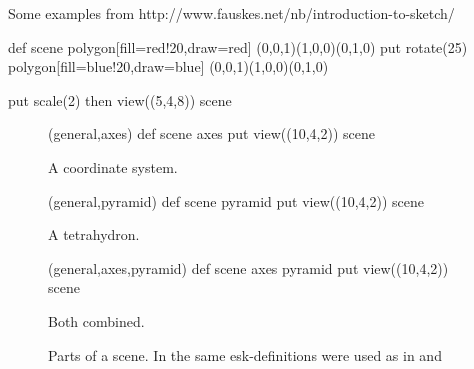 \documentclass[12pt]{article}
\makeatletter
\newenvironment{SubFloat}[2][]%
{\def\sf@one{#1}%
	\def\sf@two{#2}%
		\setbox\sf@box\hbox
		\bgroup}%
{ \egroup
	\ifx\@empty\sf@two\@empty\relax
		\def\sf@two{\@empty}
	\fi
	\ifx\@empty\sf@one\@empty\relax
		\subfloat[\sf@two]{\box\sf@box}%
	\else
		\subfloat[\sf@one][\sf@two]{\box\sf@box}%
	\fi}
\makeatother
\begin{document}
	Some examples from http://www.fauskes.net/nb/introduction-to-sketch/	
	\begin{center}
		\begin{esk}
			def scene{
			    polygon[fill=red!20,draw=red]
				(0,0,1)(1,0,0)(0,1,0)
			    put {rotate(25)} {polygon[fill=blue!20,draw=blue]
				(0,0,1)(1,0,0)(0,1,0)}
			}

			put { scale(2) then view((5,4,8)) } {scene}
		\end{esk}
		
		\begin{figure}[ht]
			\centering
			\begin{SubFloat}{\label{fig:verbone}A coordinate system.}
				\begin{minipage}[t]{1.5in}
					\centering
					\begin{esk}(general,axes)
						def scene {
							{axes}
						}
						put { view((10,4,2)) } {scene}
					\end{esk}
				\end{minipage}%
			\end{SubFloat}%
			\begin{SubFloat}{\label{fig:verbtwo}A tetrahydron.}
				\begin{minipage}[t]{1.5in}
					\centering
					\begin{esk}(general,pyramid)
						def scene {
							{pyramid}
						}
						put { view((10,4,2)) } {scene}
					\end{esk}
				\end{minipage}%
			\end{SubFloat}%
			\begin{SubFloat}{\label{fig:verbthree}Both combined.}
				\begin{minipage}[t]{1.5in}
					\centering
					\begin{esk}(general,axes,pyramid)
						def scene {
							{axes}
							{pyramid}
						}
						put { view((10,4,2)) } {scene}
					\end{esk}
				\end{minipage}%
			\end{SubFloat}%
			\label{fig:verbatim}
			\caption{Parts of a scene. In  the same esk-definitions were used as in  and }
		\end{figure}
		
	\end{center}
\end{document}
